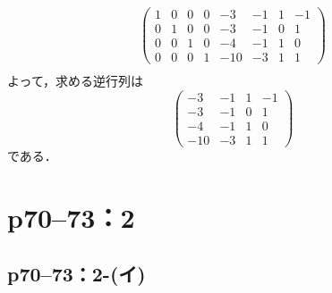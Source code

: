 \documentclass[a4paper,10pt,fleqn]{ltjsarticle}
\begin{document}
\begin{leftbar}
\begin{align*}
    \left( \begin{array}{cccc|cccc}
               1 & 0 & 0 & 0 & -3  & -1 & 1 & -1 \\
               0 & 1 & 0 & 0 & -3  & -1 & 0 & 1  \\
               0 & 0 & 1 & 0 & -4  & -1 & 1 & 0  \\
               0 & 0 & 0 & 1 & -10 & -3 & 1 & 1
             \end{array}
    \right)                                         \\
  \end{align*}
  よって，求める逆行列は
  \[
    \begin{pmatrix} -3 & -1 & 1& -1 \\ -3 & -1 & 0 & 1 \\ -4 & -1 & 1 & 0 \\ -10 & -3 & 1& 1 \end{pmatrix}
  \]
  である．
\end{leftbar}

\newpage

\section*{p70--73：2}

\subsection*{p70--73：2-(イ)}
\end{document}
